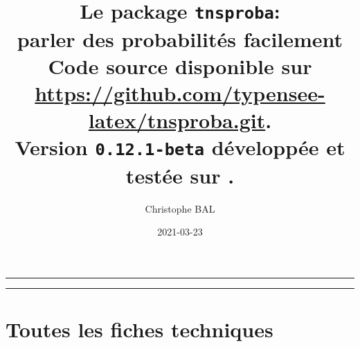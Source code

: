\documentclass[12pt,a4paper]{article}
\begin{document}
\renewcommand\labelitemi{\raisebox{0.125em}{\tiny\textbullet}}
\renewcommand{\labelitemii}{---}

\title{  %
	Le package \texttt{tnsproba}:\\%
	parler des probabilités facilement\\%
	{\footnotesize Code source disponible sur \url{https://github.com/typensee-latex/tnsproba.git}.}\\%
{\footnotesize Version \texttt{0.12.1-beta} développée et testée sur \macosxname{}.}%
}
\author{Christophe BAL}
\date{2021-03-23}

\maketitle


\vspace{2em}

\hrule

\tableofcontents

\vspace{1.5em}

\hrule

\newpage



\newpage
\section{Toutes les fiches techniques} \label{techincal-ids}

\end{document}
